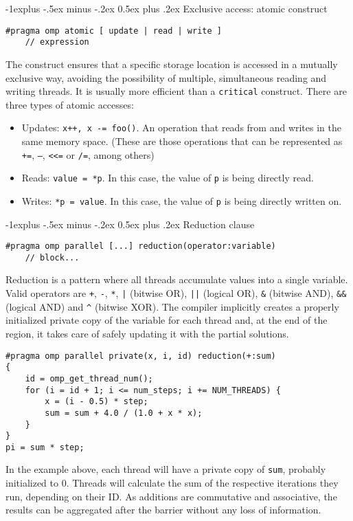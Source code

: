 \documentclass[10pt,landscape]{article}
\makeatletter
\renewcommand{\subsection}{\@startsection{subsection}{2}{0mm}%
                                {-1explus -.5ex minus -.2ex}%
                                {0.5ex plus .2ex}%
                                {\normalfont\normalsize\bfseries}}
\makeatother
\begin{document}
\begin{multicols}{3}
\subsection{Exclusive access: atomic construct}
\begin{verbatim}
#pragma omp atomic [ update | read | write ]
    // expression
\end{verbatim}
The construct ensures that a specific storage location is accessed in a mutually exclusive way, avoiding the possibility of multiple, simultaneous reading and writing threads. It is usually more efficient than a \texttt{critical} construct. There are three types of atomic accesses:
\begin{itemize}
    \item Updates: \texttt{x++, x -= foo()}. An operation that reads from and writes in the same memory space. (These are those operations that can be represented as \texttt{+=}, \texttt{--}, \texttt{<<=} or \texttt{/=}, among others)
    \item Reads: \texttt{value = *p}. In this case, the value of \texttt{p} is being directly read.
    \item Writes: \texttt{*p = value}. In this case, the value of \texttt{p} is being directly written on.
\end{itemize}
\subsection{Reduction clause}
\begin{verbatim}
#pragma omp parallel [...] reduction(operator:variable)
    // block...
\end{verbatim}
\par
Reduction is a pattern where all threads accumulate values into a single variable. Valid operators are \texttt{+}, \texttt{-}, \texttt{*}, \texttt{|} (bitwise OR), \texttt{||} (logical OR), \texttt{\&} (bitwise AND), \texttt{\&\&} (logical AND) and \texttt{\^} (bitwise XOR). The compiler implicitly creates a properly initialized private copy of the variable for each thread and, at the end of the region, it takes care of safely updating it with the partial solutions.
\begin{verbatim}
#pragma omp parallel private(x, i, id) reduction(+:sum)
{
    id = omp_get_thread_num();
    for (i = id + 1; i <= num_steps; i += NUM_THREADS) {
        x = (i - 0.5) * step;
        sum = sum + 4.0 / (1.0 + x * x);
    }
}
pi = sum * step;
\end{verbatim}
\par
In the example above, each thread will have a private copy of \texttt{sum}, probably initialized to 0. Threads will calculate the sum of the respective iterations they run, depending on their ID. As additions are commutative and associative, the results can be aggregated after the barrier without any loss of information.

\end{multicols}
\end{document}
